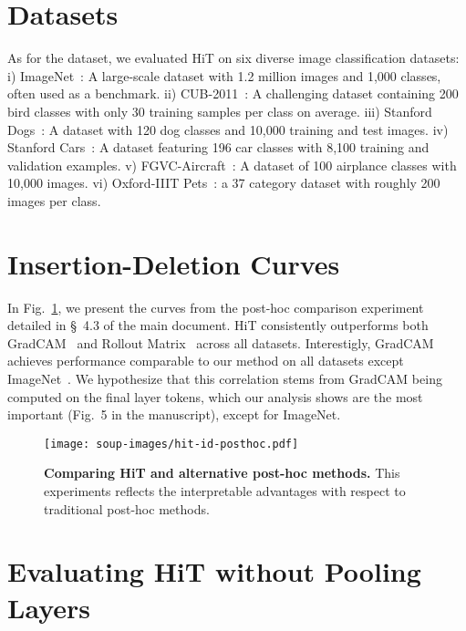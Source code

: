 
\section{Datasets}

As for the dataset, we evaluated HiT on six diverse image classification datasets: 
i) ImageNet~\cite{deng2009imagenet}:  A large-scale dataset with 1.2 million images and 1,000 classes, often used as a benchmark. 
ii) CUB-2011~\cite{WahCUB_200_2011}: A challenging dataset containing 200 bird classes with only 30 training samples per class on average.
iii) Stanford Dogs~\cite{KhoslaYaoJayadevaprakashFeiFei_FGVC2011}:  A dataset with 120 dog classes and 10,000 training and test images.
iv) Stanford Cars~\cite{krause20133d}:  A dataset featuring 196 car classes with 8,100 training and validation examples.
v) FGVC-Aircraft~\cite{maji13fine-grained}: A dataset of 100 airplance classes with 10,000 images.
vi) Oxford-IIIT Pets~\cite{parkhi12a}: a 37 category dataset with roughly 200 images per class.


\section{Insertion-Deletion Curves}

In Fig.~\ref{fig:soup:posthoc-curves}, we present the curves from the post-hoc comparison experiment detailed in \S~4.3 of the main document. HiT consistently outperforms both GradCAM~\cite{8237336} and Rollout Matrix~\cite{abnar2020quantifying} across all datasets. Interestigly, GradCAM achieves performance comparable to our method on all datasets except ImageNet~\cite{deng2009imagenet}. We hypothesize that this correlation stems from GradCAM being computed on the final layer tokens, which our analysis shows are the most important (Fig.~5 in the manuscript), except for ImageNet. %

\begin{figure}[h]
    \centering
    \texttt{[image: soup-images/hit-id-posthoc.pdf]}
    \caption{\textbf{Comparing HiT and alternative post-hoc methods.} This experiments reflects the interpretable advantages with respect to traditional post-hoc methods.}
    \label{fig:soup:posthoc-curves}
\end{figure}

\section{Evaluating HiT without Pooling Layers}

